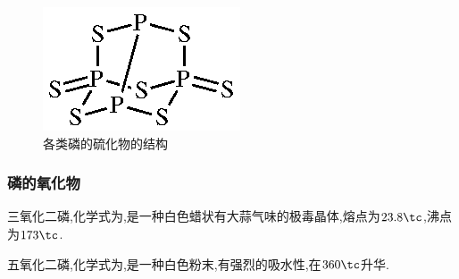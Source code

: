 \documentclass{ctexart}
\begin{document}
\begin{figure}[H]
{        \begin{minipage}[b]{.23\linewidth}
            \centering\includegraphics{picture/P4S7.eps}
        \end{minipage}
    }
     \caption{各类磷的硫化物的结构}
\end{figure}
\subsubsection{磷的氧化物}
\begin{substance}[\ce{P4O6}]
    三氧化二磷,化学式为,是一种白色蜡状有大蒜气味的极毒晶体,熔点为$23.8\tc$,沸点为$173\tc$.
\end{substance}
\begin{substance}[\ce{P4O10}]
    五氧化二磷,化学式为,是一种白色粉末,有强烈的吸水性,在$360\tc$升华.
\end{substance}
\end{document}
